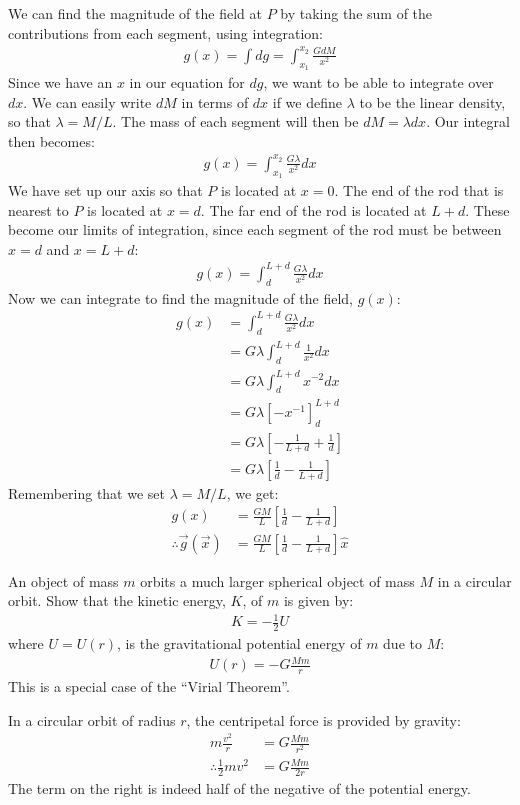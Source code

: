\begin{solution}
We can find the magnitude of the field at $P$ by taking the sum of the contributions from each segment, using integration:
\begin{align*}
g(x)=\int dg=\int_{x_1}^{x_2} \frac{G dM}{x^2}
\end{align*}
Since we have an $x$ in our equation for $dg$, we want to be able to integrate over $dx$. We can easily write $dM$ in terms of $dx$ if we define $\lambda$ to be the linear density, so that $\lambda=M/L$. The mass of each segment will then be $dM=\lambda dx$. Our integral then becomes:
\begin{align*}
g(x)=\int_{x_1}^{x_2} \frac{G\lambda}{x^2}dx
\end{align*}
We have set up our axis so that $P$ is located at $x=0$. The end of the rod that is nearest to $P$ is located at $x=d$. The far end of the rod is located at $L+d$. These become our limits of integration, since each segment of the rod must be between $x=d$ and $x=L+d$:
\begin{align*}
g(x)=\int_{d}^{L+d} \frac{G\lambda}{x^2}dx
\end{align*}
Now we can integrate to find the magnitude of the field, $g(x)$:
\begin{align*}
g(x)&=\int_{d}^{L+d} \frac{G\lambda}{x^2}dx\\
&=G\lambda\int_{d}^{L+d} \frac{1}{x^2}dx\\
&=G\lambda\int_{d}^{L+d} x^{-2}dx\\
&=G\lambda[-x^{-1}]_d^{L+d}\\
&=G\lambda\left[-\frac{1}{L+d}+\frac{1}{d}\right]\\
&=G\lambda\left[\frac{1}{d}-\frac{1}{L+d}\right]
\end{align*}
Remembering that we set $\lambda=M/L$, we get:
\begin{align*}
g(x)&=\frac{GM}{L}\left[\frac{1}{d}-\frac{1}{L+d}\right]\\
\therefore \vec g(\vec x)&=\frac{GM}{L}\left[\frac{1}{d}-\frac{1}{L+d}\right]\hat{x}
\end{align*}
\end{solution}

\question An object of mass $m$ orbits a much larger spherical object of mass $M$ in a circular orbit. Show that the kinetic energy, $K$, of $m$ is given by:
\begin{align*}
K=-\frac{1}{2}U
\end{align*}
where $U=U(r)$, is the gravitational potential energy of $m$ due to $M$:
\begin{align*}
U(r)=-G\frac{Mm}{r}
\end{align*}
This is a special case of the ``Virial Theorem''.
\begin{solution}
In a circular orbit of radius $r$, the centripetal force is provided by gravity:
\begin{align*}
m\frac{v^2}{r}&=G\frac{Mm}{r^2}\\
\therefore \frac{1}{2}mv^2 &=G\frac{Mm}{2r}
\end{align*}
The term on the right is indeed half of the negative of the potential energy.
\end{solution}

